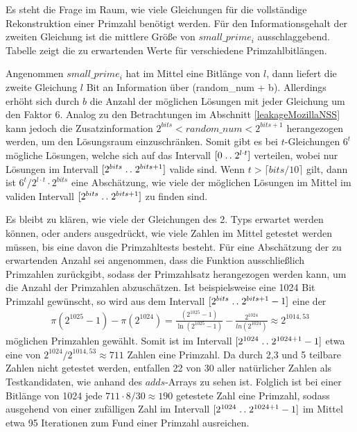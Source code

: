 Es steht die Frage im Raum, wie viele Gleichungen für die vollständige Rekonstruktion einer Primzahl benötigt werden.
Für den Informationsgehalt der zweiten Gleichung ist die mittlere Größe von $small\_prime_i$ ausschlaggebend.
Tabelle %
zeigt die zu erwartenden Werte für verschiedene Primzahlbitlängen. 

Angenommen $small\_prime_i$ hat im Mittel eine Bitlänge von $l$, dann liefert die zweite Gleichung $l$ Bit an Information über (random\_num + b).
Allerdings erhöht sich durch $b$ die Anzahl der möglichen Lösungen mit jeder Gleichung um den Faktor 6.
Analog zu den Betrachtungen im Abschnitt \ref{leakageMozillaNSS} kann jedoch die Zusatzinformation $2^{bits} < random\_num < 2^{bits+1}$ herangezogen werden, um den Lösungsraum einzuschränken.
Somit gibt es bei $t$-Gleichungen $6^t$ mögliche Lösungen, welche sich auf das Intervall $[0 \mathrel{{.}\,{.}}\nobreak2^{l\cdot t}]$ verteilen, wobei nur Lösungen im Intervall $[2^{bits} \mathrel{{.}\,{.}}\nobreak 2^{bits+1}]$ valide sind.
Wenn $t > \lceil bits/10 \rceil$ gilt, dann ist $6^t/2^{l \cdot t} \cdot 2^{bits}$ eine Abschätzung, wie viele der möglichen Lösungen im Mittel im validen Intervall $[2^{bits} \mathrel{{.}\,{.}}\nobreak 2^{bits+1}]$ zu finden sind.

Es bleibt zu klären, wie viele der Gleichungen des 2. Typs erwartet werden können, oder anders ausgedrückt, wie viele Zahlen im Mittel getestet werden müssen, bis eine davon die Primzahltests besteht. 
Für eine Abschätzung der zu erwartenden Anzahl sei angenommen, dass die Funktion ausschließlich Primzahlen zurückgibt, sodass der Primzahlsatz herangezogen werden kann, um die Anzahl der Primzahlen abzuschätzen.
Ist beispielsweise eine 1024 Bit Primzahl gewünscht, so wird aus dem Intervall $[2^{bits}\mathrel{{.}\,{.}}\nobreak 2^{bits+1}-1]$ eine der \begin{align}
\pi(2^{1025}-1) - \pi(2^{1024}) = \frac{(2^{1025}-1)}{\ln(2^{1025}-1)} - \frac{2^{1024}}{ln(2^{1024})} \approx 2^{1014,53}
\end{align}
möglichen Primzahlen gewählt.
Somit ist im Intervall $[2^{1024}\mathrel{{.}\,{.}}\nobreak 2^{1024+1}-1]$ etwa eine von $2^{1024}/2^{1014,53} \approx 711$ Zahlen eine Primzahl.
Da durch 2,3 und 5 teilbare Zahlen nicht getestet werden, entfallen 22 von 30 aller natürlicher Zahlen als Testkandidaten, wie anhand des $adds$-Arrays zu sehen ist.
Folglich ist bei einer Bitlänge von 1024 jede $711 \cdot 8/30 \approx 190$ getestete Zahl eine Primzahl, sodass ausgehend von einer zufälligen Zahl im Intervall $[2^{1024}\mathrel{{.}\,{.}}\nobreak 2^{1024+1}-1]$ im Mittel etwa 95 Iterationen zum Fund einer Primzahl ausreichen.

